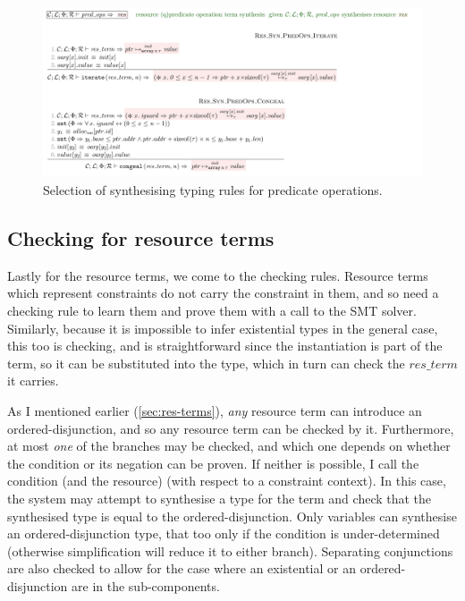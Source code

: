 \begin{figure}[tp]
    \includegraphics{figures/kernel-predops-typing}
    \caption{Selection of  synthesising typing rules for
        predicate operations.}\label{fig:typing-predops}
\end{figure}

\subsection{Checking for resource terms}\label{subsec:checking-res-terms}

Lastly for the resource terms, we come to the checking rules. Resource terms
which represent constraints do not carry the constraint in them, and so need a
checking rule to learn them and prove them with a call to the SMT solver.
Similarly, because it is impossible to infer existential types in the general
case, this too
is checking, and is straightforward since the instantiation is part of the
term, so it can be substituted into the type, which in turn can check the
$\mathit{res\_term}$ it carries.

As I mentioned earlier (\cref{sec:res-terms}), \emph{any} resource term can
introduce an ordered-disjunction, and so any resource term can be checked by
it. Furthermore, at most \emph{one} of the branches may be checked, and which
one depends on whether the condition or its negation can be proven. If
neither is possible, I call the condition (and the resource)
 (with respect to a constraint context). In this case,
the system may attempt to synthesise a type for the term and check that the
synthesised type is equal to the ordered-disjunction. Only variables can
synthesise an ordered-disjunction type, that too only if the condition is
under-determined (otherwise simplification will reduce it to either branch).
Separating conjunctions are also checked to allow for the case where an
existential or an ordered-disjunction are in the sub-components.

